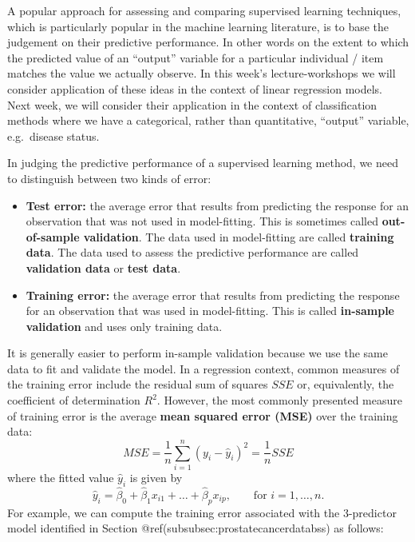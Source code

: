\documentclass[
]{article}
\providecommand{\tightlist}{%
  \setlength{\itemsep}{0pt}\setlength{\parskip}{0pt}}
\begin{document}
A popular approach for assessing and comparing supervised learning
techniques, which is particularly popular in the machine learning
literature, is to base the judgement on their predictive performance. In
other words on the extent to which the predicted value of an ``output''
variable for a particular individual / item matches the value we
actually observe. In this week's lecture-workshops we will consider
application of these ideas in the context of linear regression models.
Next week, we will consider their application in the context of
classification methods where we have a categorical, rather than
quantitative, ``output'' variable, e.g.~disease status.

In judging the predictive performance of a supervised learning method,
we need to distinguish between two kinds of error:

\begin{itemize}
\tightlist
\item
  \textbf{Test error:} the average error that results from predicting
  the response for an observation that was not used in model-fitting.
  This is sometimes called \textbf{out-of-sample validation}. The data
  used in model-fitting are called \textbf{training data}. The data used
  to assess the predictive performance are called \textbf{validation
  data} or \textbf{test data}.
\item
  \textbf{Training error:} the average error that results from
  predicting the response for an observation that was used in
  model-fitting. This is called \textbf{in-sample validation} and uses
  only training data.
\end{itemize}

It is generally easier to perform in-sample validation because we use
the same data to fit and validate the model. In a regression context,
common measures of the training error include the residual sum of
squares \(SSE\) or, equivalently, the coefficient of determination
\(R^2\). However, the most commonly presented measure of training error
is the average \textbf{mean squared error (MSE)} over the training data:
\begin{equation*}
MSE = \frac{1}{n} \sum_{i=1}^n (y_i - \hat{y}_i)^2 = \frac{1}{n} SSE
\end{equation*} where the fitted value \(\hat{y}_i\) is given by
\begin{equation*}
\hat{y}_i = \hat{\beta}_0 +  \hat{\beta}_1 x_{i1} + \ldots + \hat{\beta}_p x_{ip}, \qquad \text{for $i=1,\ldots,n$.}
\end{equation*} For example, we can compute the training error
associated with the 3-predictor model identified in Section
@ref(subsubsec:prostatecancerdatabss) as follows:
\end{document}
